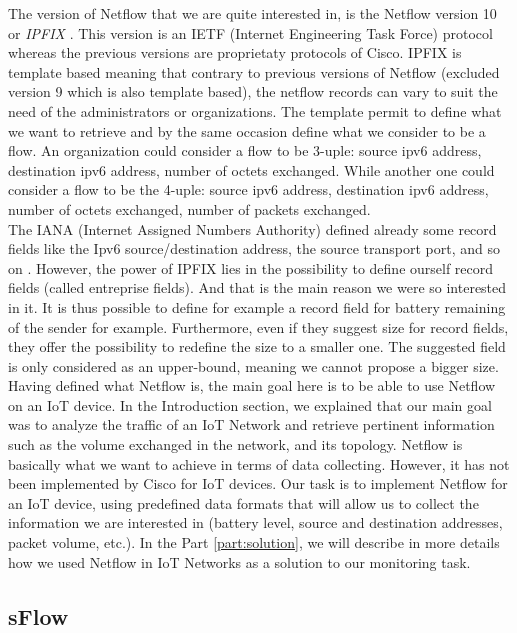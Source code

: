 The version of Netflow that we are quite interested in, is the Netflow version 10 or \textit{IPFIX} \cite{claise2013rfc}. This version is an IETF (Internet Engineering Task Force) protocol whereas the previous versions are proprietaty protocols of Cisco. IPFIX is template based meaning that contrary to previous versions of Netflow (excluded version 9 which is also template based), the netflow records can vary to suit the need of the administrators or organizations. The template permit to define what we want to retrieve and by the same occasion define what we consider to be a flow. An organization could consider a flow to be 3-uple: source ipv6 address, destination ipv6 address, number of octets exchanged. While another one could consider a flow to be the 4-uple: source ipv6 address, destination ipv6 address, number of octets exchanged, number of packets exchanged. \\

The IANA (Internet Assigned Numbers Authority) defined already some record fields like the Ipv6 source/destination address, the source transport port, and so on \cite{website:ipfix_entities}. However, the power of IPFIX lies in the possibility to define ourself record fields (called entreprise fields). And that is the main reason we were so interested in it. It is thus possible to define for example a record field for battery remaining of the sender for example. Furthermore, even if they suggest size for record fields, they offer the possibility to redefine the size to a smaller one. The suggested field is only considered as an upper-bound, meaning we cannot propose a bigger size.\\

Having defined what Netflow is, the main goal here is to be able to use Netflow on an IoT device. In the Introduction section, we explained that our main goal was to analyze the traffic of an IoT Network and retrieve pertinent information such as the volume exchanged in the network, and its topology. Netflow is basically what we want to achieve in terms of data collecting. However, it has not been implemented by Cisco for IoT devices. Our task is to implement Netflow for an IoT device, using predefined data formats that will allow us to collect the information we are interested in (battery level, source and destination addresses, packet volume, etc.). In the Part \ref{part:solution}, we will describe in more details how we used Netflow in IoT Networks as a solution to our monitoring task.

\subsection{sFlow}

